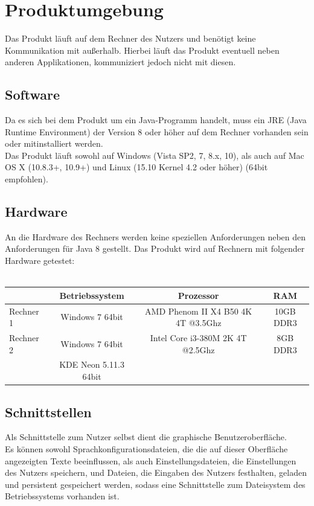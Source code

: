 \documentclass[parskip=full]{scrartcl}
\begin{document}
 

\section{Produktumgebung}
Das Produkt läuft auf dem Rechner des Nutzers und benötigt keine Kommunikation mit außerhalb. Hierbei läuft das Produkt eventuell neben anderen Applikationen, kommuniziert jedoch nicht mit diesen.

\subsection{Software}
Da es sich bei dem Produkt um ein Java-Programm handelt, muss ein JRE (Java Runtime Environment) der Version 8 oder höher auf dem Rechner vorhanden sein oder mitinstalliert werden. \\
Das Produkt läuft sowohl auf Windows (Vista SP2, 7, 8.x, 10), als auch auf Mac OS X (10.8.3+, 10.9+) und Linux (15.10 Kernel 4.2 oder höher) (64bit empfohlen).

\subsection{Hardware}
An die Hardware des Rechners werden keine speziellen Anforderungen neben den Anforderungen für Java 8 gestellt. Das Produkt wird auf Rechnern mit folgender Hardware getestet: \\ \\
\begin{tabular}{l||c|c|c}
   	& Betriebssystem & Prozessor & RAM \\
	\hline
	\hline
	Rechner 1 & Windows 7 64bit & AMD Phenom II X4 B50 4K 4T @3.5Ghz & 10GB DDR3 \\
	Rechner 2 & Windows 7 64bit & Intel Core i3-380M 2K 4T @2.5Ghz & 8GB DDR3 \\
	 & KDE Neon 5.11.3 64bit &  \\
\end{tabular}

\subsection{Schnittstellen}
Als Schnittstelle zum Nutzer selbst dient die graphische Benutzeroberfläche. \\ Es können sowohl Sprachkonfigurationsdateien, die die auf dieser Oberfläche angezeigten Texte beeinflussen, als auch Einstellungsdateien, die Einstellungen des Nutzers speichern, und Dateien, die Eingaben des Nutzers festhalten, geladen und persistent gespeichert werden, sodass eine Schnittstelle zum Dateisystem des Betriebssystems vorhanden ist. 
\end{document}
